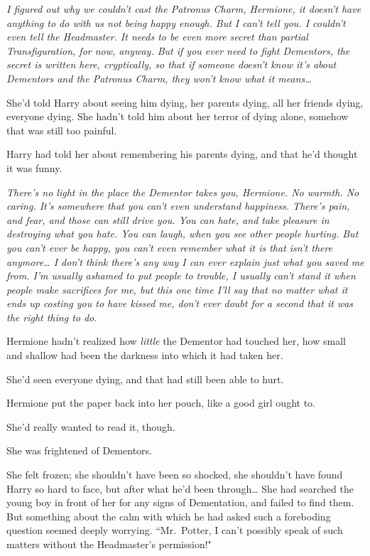 \emph{I figured out why we couldn't cast the Patronus Charm, Hermione, it doesn't have anything to do with us not being happy enough. But I can't tell you. I couldn't even tell the Headmaster. It needs to be even more secret than partial Transfiguration, for now, anyway. But if you ever need to fight Dementors, the secret is written here, cryptically, so that if someone doesn't know it's about Dementors and the Patronus Charm, they won't know what it means{\ldots}}

She'd told Harry about seeing him dying, her parents dying, all her friends dying, everyone dying. She hadn't told him about her terror of dying alone, somehow that was still too painful.

Harry had told her about remembering his parents dying, and that he'd thought it was funny.

\emph{There's no light in the place the Dementor takes you, Hermione. No warmth. No caring. It's somewhere that you can't even understand happiness. There's pain, and fear, and those can still drive you. You can hate, and take pleasure in destroying what you hate. You can laugh, when you see other people hurting. But you can't ever be happy, you can't even remember what it is that isn't there anymore{\ldots} I don't think there's any way I can ever explain just what you saved me from. I'm usually ashamed to put people to trouble, I usually can't stand it when people make sacrifices for me, but this one time I'll say that no matter what it ends up costing you to have kissed me, don't ever doubt for a second that it was the right thing to do.}

Hermione hadn't realized how \emph{little} the Dementor had touched her, how small and shallow had been the darkness into which it had taken her.

She'd seen everyone dying, and that had still been able to hurt.

Hermione put the paper back into her pouch, like a good girl ought to.

She'd really wanted to read it, though.

She was frightened of Dementors.


She felt frozen; she shouldn't have been so shocked, she shouldn't have found Harry so hard to face, but after what he'd been through{\ldots} She had searched the young boy in front of her for any signs of Dementation, and failed to find them. But something about the calm with which he had asked such a foreboding question seemed deeply worrying. ``Mr.~Potter, I can't possibly speak of such matters without the Headmaster's permission!"

